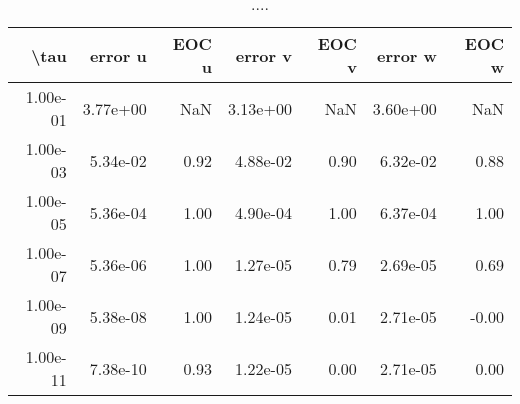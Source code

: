 \begin{table}[ht]
\centering
\begin{tabular}{rrrrrrr}
  \hline
  \textbf{\textbackslash{}tau} & \textbf{error u} & \textbf{EOC u} & \textbf{error v} & \textbf{EOC v} & \textbf{error w} & \textbf{EOC w} \\\hline
  1.00e-01 & 3.77e+00 & NaN & 3.13e+00 & NaN & 3.60e+00 & NaN \\
  1.00e-03 & 5.34e-02 & 0.92 & 4.88e-02 & 0.90 & 6.32e-02 & 0.88 \\
  1.00e-05 & 5.36e-04 & 1.00 & 4.90e-04 & 1.00 & 6.37e-04 & 1.00 \\
  1.00e-07 & 5.36e-06 & 1.00 & 1.27e-05 & 0.79 & 2.69e-05 & 0.69 \\
  1.00e-09 & 5.38e-08 & 1.00 & 1.24e-05 & 0.01 & 2.71e-05 & -0.00 \\
  1.00e-11 & 7.38e-10 & 0.93 & 1.22e-05 & 0.00 & 2.71e-05 & 0.00 \\\hline
\end{tabular}
\caption{....}
\end{table}
